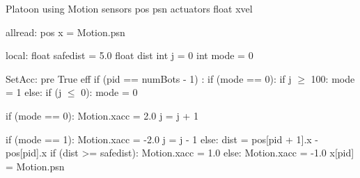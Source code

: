 Platoon
using Motion 
    sensors pos psn
    actuators float xvel
       
allread:
   pos x = Motion.psn

local:
   float safedist = 5.0
   float dist 
   int j = 0 
   int mode = 0

SetAcc:
  pre True
  eff
     if (pid == numBots - 1) :
        if (mode == 0):
            if j $\geq$ 100:
                 mode = 1
        else:
            if (j $\leq$ 0):
                mode = 0
                
        if (mode == 0):
            Motion.xacc = 2.0
            j = j + 1
          
        if (mode == 1):
            Motion.xacc = -2.0
            j = j - 1
     else:
        dist = pos[pid + 1].x - pos[pid].x
        if (dist >= safedist):
            Motion.xacc = 1.0
        else:
            Motion.xacc = -1.0
    x[pid] = Motion.psn

